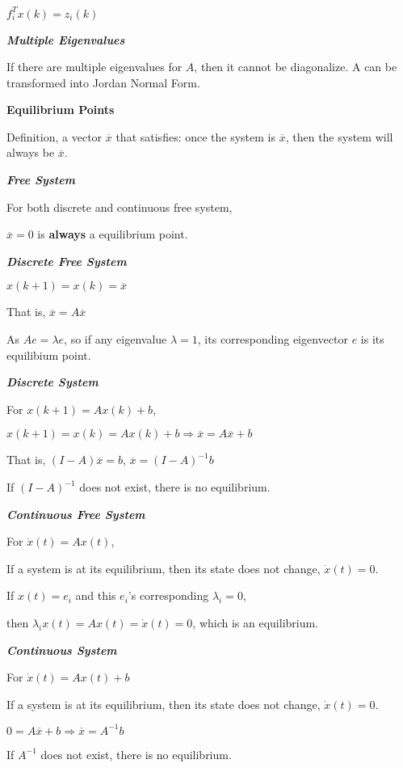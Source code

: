 \documentclass{article}
\newcommand{\bigtitle}[1]{
	\noindent
	\textbf{#1}
}
\newcommand{\smalltitle}[1]{
	\noindent
	\textbf{\textit{#1}}
}
\begin{document}
\begin{spacing}{1.2}
$f_i^T x(k) = z_i(k)$



\smalltitle{Multiple Eigenvalues}

If there are multiple eigenvalues for $A$, then it cannot be diagonalize. A can be transformed into Jordan Normal Form.


\bigtitle{Equilibrium Points}

Definition, a vector $\overline{x}$ that satisfies: once the system is $\overline{x}$, then the system will always be $\overline{x}$.

\smalltitle{Free System}

For both discrete and continuous free system,

$\overline{x} = 0$ is \textbf{always} a equilibrium point.


\smalltitle{Discrete Free System}

$x(k+1)=x(k)=\overline{x}$

That is, $\overline{x}=A \overline{x}$

As $A e=\lambda e$, so if any eigenvalue $\lambda=1$, its corresponding eigenvector $e$ is its equilibium point.

\smalltitle{Discrete System}

For $x(k+1)=A x(k)+b$,

$x(k+1)=x(k)=Ax(k)+b \Rightarrow \overline{x}=A \overline{x}+b$

That is, $(I-A) \overline{x}=b$, $\overline{x}=(I-A)^{-1} b$

If $(I-A)^{-1}$ does not exist, there is no equilibrium.

\smalltitle{Continuous Free System}

For $\dot{x}(t)=A x(t)$,

If a system is at its equilibrium, then its state does not change, $\dot{x}(t)=0$.

If $x(t)=e_{i}$ and this $e_i$'s corresponding $\lambda_i = 0$, 

then $\lambda_{i} x(t)=A x(t)=\dot{x}(t)=0$, which is an equilibrium.




\smalltitle{Continuous System}

For $\dot{x}(t)=A x(t)+b$

If a system is at its equilibrium, then its state does not change, $\dot{x}(t)=0$.

$0=A \overline{x}+b \Rightarrow \overline{x}=A^{-1} b$

If $A^{-1}$ does not exist, there is no equilibrium.




\end{spacing}
\end{document}
